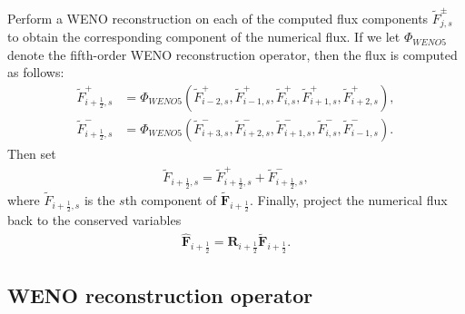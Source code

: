 Perform a W\+E\+NO reconstruction on each of the computed flux components $\tilde{F}_{j,s}^{\pm}$ to obtain the corresponding component of the numerical flux. If we let $\Phi_{WENO5}$ denote the fifth-\/order W\+E\+NO reconstruction operator, then the flux is computed as follows\+: \[ \begin{align*} \tilde{F}_{i+\frac{1}{2},s}^{+} &= \Phi_{WENO5}(\tilde{F}_{i-2,s}^{+},\tilde{F}_{i-1,s}^{+},\tilde{F}_{i,s}^{+},\tilde{F}_{i+1,s}^{+},\tilde{F}_{i+2,s}^{+}), \\ \tilde{F}_{i+\frac{1}{2},s}^{-} &= \Phi_{WENO5}(\tilde{F}_{i+3,s}^{-},\tilde{F}_{i+2,s}^{-},\tilde{F}_{i+1,s}^{-},\tilde{F}_{i,s}^{-},\tilde{F}_{i-1,s}^{-}). \end{align*} \] Then set \[ \begin{align*} \tilde{F}_{i+\frac{1}{2},s} = \tilde{F}_{i+\frac{1}{2},s}^{+} + \tilde{F}_{i+\frac{1}{2},s}^{-}, \end{align*} \] where $\tilde{F}_{i+\frac{1}{2},s}$ is the $s$th component of $\tilde{\mathbf{F}}_{i+\frac{1}{2}}$.  Finally, project the numerical flux back to the conserved variables \[ \begin{align*} \hat{\mathbf{F}}_{i+\frac{1}{2}} = \mathbf{R}_{i+\frac{1}{2}}\tilde{\mathbf{F}}_{i+\frac{1}{2}}. \end{align*} \]\hypertarget{weno_reconstruction}{}\subsection{W\+E\+N\+O reconstruction operator}\label{weno_reconstruction}
